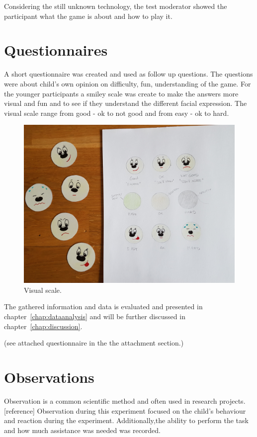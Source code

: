Considering the still unknown technology, the test moderator showed the participant what the game is about and how to play it. 




\section{Questionnaires}

A short questionnaire was created and used as follow up questions. The questions were about child's own opinion on difficulty, fun, understanding of the game. For the younger participants a smiley scale was create to make the answers more visual and fun and to see if they understand the different facial expression.
The visual scale range from  good - ok to not good and from easy - ok to hard.

\begin{figure}[h]  %
  \centering
  \includegraphics[width=.5\textwidth]{figures/scale.jpg}
  \caption[Visual scale.]{Visual scale.}
  \label{fig:scale}
\end{figure}

The gathered information and data is evaluated and presented in chapter~\ref{chap:dataanalysis} and will be further discussed in chapter~\ref{chap:discussion}.

(see attached questionnaire in the the attachment section.)



\section{Observations}

Observation is a common scientific method and often used in research projects.[reference] 
Observation during this experiment focused on the child's behaviour and reaction during the experiment. Additionally,the ability to perform the task and how much assistance was needed was recorded.